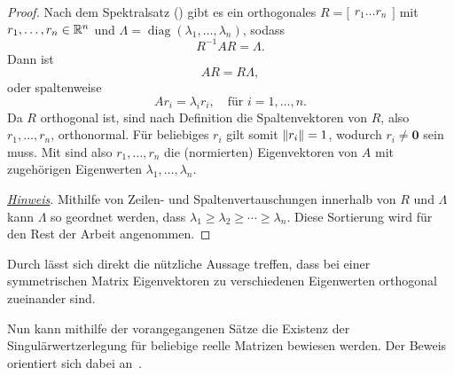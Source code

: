 \begin{proof}
    Nach dem Spektralsatz () gibt es ein orthogonales 
    \(
    R=
    \big[
    \begin{matrix}
        r_1 \dots r_n
    \end{matrix}
    \big]
    \)
    mit
    \(r_1,\ldots,r_n \in \mathbb{R}^{n}\) 
    und 
    \(\Lambda = \operatorname{diag}(\lambda_1,\ldots,\lambda_n)\), sodass
    \begin{equation*}
        R^{-1}AR = \Lambda.
    \end{equation*}
    Dann ist
    \begin{equation*}
        AR = R\Lambda, 
    \end{equation*} 
    oder spaltenweise
    \begin{equation*}
        Ar_i = {\lambda}_i r_i, \quad \text{für } i = 1,\ldots,n.
    \end{equation*}
    Da \(R\) orthogonal ist, sind nach Definition die Spaltenvektoren von \(R\), also \(r_1,\ldots,r_n\), orthonormal.
    Für beliebiges \(r_i\) gilt somit \(\lVert r_i\rVert = 1\), wodurch \(r_i \neq \symbf{0}\) sein muss.
    Mit  sind also \(r_1,\ldots,r_n\) die (normierten) Eigenvektoren von \(A\) mit zugehörigen Eigenwerten \(\lambda_1,\ldots,\lambda_n\).
    
    \underline{\emph{Hinweis}}. Mithilfe von Zeilen- und Spaltenvertauschungen innerhalb von \(R\) und \(\Lambda\) kann \(\Lambda\) so geordnet werden, dass \(\lambda_1 \geq \lambda_2 \geq \cdots \geq \lambda_n\).
Diese Sortierung wird für den Rest der Arbeit angenommen.
\end{proof}
\begin{remark}
    Durch  lässt sich direkt die nützliche Aussage treffen, dass bei einer symmetrischen Matrix Eigenvektoren zu verschiedenen Eigenwerten orthogonal zueinander sind. 
\end{remark}
Nun kann mithilfe der vorangegangenen Sätze die Existenz der Singulärwertzerlegung für beliebige reelle Matrizen bewiesen werden.
Der Beweis orientiert sich dabei an~\cite{chenLecture5Singular2020}.

